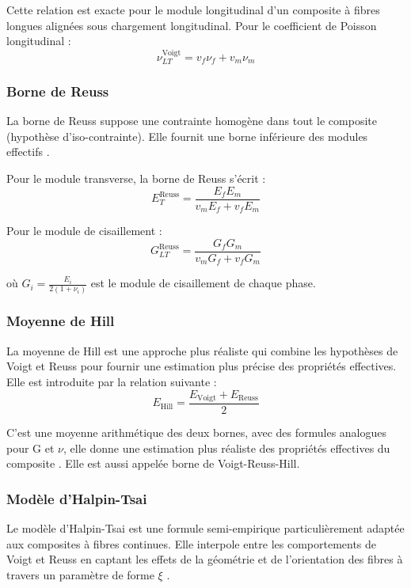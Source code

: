\documentclass[a4paper,11pt]{article}
\begin{document}
Cette relation est exacte pour le module longitudinal d'un composite à fibres longues alignées sous chargement longitudinal. Pour le coefficient de Poisson longitudinal :
\begin{equation}
\nu_{LT}^{\text{Voigt}} = v_f \nu_f + v_m \nu_m
\end{equation}

\subsubsection*{Borne de Reuss}

La borne de Reuss suppose une contrainte homogène dans tout le composite (hypothèse d'iso-contrainte). Elle fournit une borne inférieure des modules effectifs \cite{Kundalwal2017}.

Pour le module transverse, la borne de Reuss s'écrit :
\begin{equation}
E_T^{\text{Reuss}} = \frac{E_f E_m}{v_m E_f + v_f E_m}
\end{equation}

Pour le module de cisaillement :
\begin{equation}
G_{LT}^{\text{Reuss}} = \frac{G_f G_m}{v_m G_f + v_f G_m}
\end{equation}

où $G_i = \frac{E_i}{2(1+\nu_i)}$ est le module de cisaillement de chaque phase.

\subsubsection*{Moyenne de Hill} 

La moyenne de Hill est une approche plus réaliste qui combine les hypothèses de Voigt et Reuss pour fournir une estimation plus précise des propriétés effectives. Elle est introduite par la relation suivante :
\begin{equation}
E_{\text{Hill}} = \frac{E_{\text{Voigt}} + E_{\text{Reuss}}}{2}
\end{equation}

C'est une moyenne arithmétique des deux bornes, avec des formules analogues pour G et $\nu$, elle donne une estimation plus réaliste des propriétés effectives du composite \cite{CharronCC}. Elle est aussi appelée borne de Voigt-Reuss-Hill.
\subsubsection*{Modèle d'Halpin-Tsai}

Le modèle d'Halpin-Tsai est une formule semi-empirique particulièrement adaptée aux composites à fibres continues. Elle interpole entre les comportements de Voigt et Reuss en captant les effets de la géométrie et de l'orientation des fibres à travers un paramètre de forme $\xi$ \cite{WallHomog} \cite{Kundalwal2017}.
\end{document}
